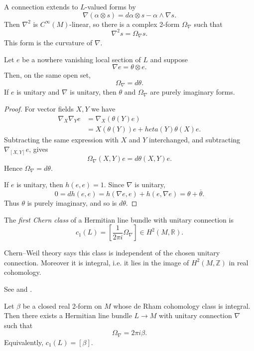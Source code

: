 \noindent
A connection extends to $L$-valued forms by
$$
\nabla(\alpha\otimes s)
=d\alpha\otimes s-\alpha\wedge \nabla s.
$$
Then $\nabla^2$ is $C^{\infty}(M)$-linear, so
there is a complex 2-form $\Omega_\nabla$
such that
$$
\nabla^2s=\Omega_\nabla s.
$$
This form is the curvature of $\nabla$.

\begin{lemma}
\label{lemma-local-curvature-line-bundle}
Let $e$ be a nowhere vanishing local section
of $L$ and suppose
$$
\nabla e=\theta\otimes e.
$$
Then, on the same open set,
$$
\Omega_\nabla=d\theta.
$$
If $e$ is unitary and $\nabla$ is unitary,
then $\theta$ and $\Omega_\nabla$ are purely
imaginary forms.
\end{lemma}

\begin{proof}
For vector fields $X,Y$ we have
$$
\begin{aligned}
\nabla_X\nabla_Ye
&=\nabla_X(\theta(Y)e)\\
&=X(\theta(Y))e+	heta(Y)\theta(X)e.
\end{aligned}
$$
Subtracting the same expression with $X$ and
$Y$ interchanged, and subtracting
$\nabla_{[X,Y]}e$, gives
$$
\Omega_\nabla(X,Y)e
=d\theta(X,Y)e.
$$
Hence $\Omega_\nabla=d\theta$.

If $e$ is unitary, then $h(e,e)=1$.  Since
$\nabla$ is unitary,
$$
0=dh(e,e)=h(\nabla e,e)+h(e,\nabla e)
=\theta+\overline\theta.
$$
Thus $\theta$ is purely imaginary, and so is
$d\theta$.
\end{proof}

\begin{definition}
\label{definition-first-chern-class}
The {\it first Chern class} of a Hermitian
line bundle with unitary connection is
$$
c_1(L)=\left[\frac{1}{2\pi i}
\Omega_\nabla\right]\in H^2(M,\mathbb R).
$$
\end{definition}

\noindent
Chern--Weil theory says this class is
independent of the chosen unitary connection.
Moreover it is integral, i.e. it lies in the
image of $H^2(M,\mathbb Z)$ in real
cohomology.

\begin{theorem}
\label{theorem-weil-integrality}
\begin{reference}
See \cite[Lecture 12]{wang} and
\cite[Section 8.3]{wood}.
\end{reference}
Let $\beta$ be a closed real 2-form on $M$
whose de Rham cohomology class is integral.
Then there exists a Hermitian line bundle
$L\to M$ with unitary connection $\nabla$
such that
$$
\Omega_\nabla=2\pi i\beta.
$$
Equivalently, $c_1(L)=[\beta]$.
\end{theorem}

